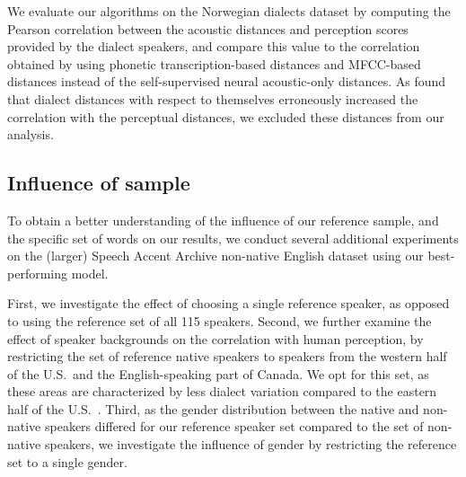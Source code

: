 \documentclass[11pt,a4paper]{article}
\begin{document}
We evaluate our algorithms on the Norwegian dialects dataset by computing the Pearson correlation between the acoustic distances and perception scores provided by the dialect speakers, and compare this value to the correlation obtained by using phonetic transcription-based distances and MFCC-based distances instead of the self-supervised neural acoustic-only distances. As \citet{gooskens2004perceptive} found that dialect distances with respect to themselves erroneously increased the correlation with the perceptual distances, we excluded these distances from our analysis.



\subsection{Influence of sample}
To obtain a better understanding of the influence of our reference sample, and the specific set of words on our results, we conduct several additional experiments on the (larger) Speech Accent Archive non-native English dataset using our best-performing model.

First, we investigate the effect of choosing a single reference speaker, as opposed to using the reference set of all 115 speakers. Second, we further examine the effect of speaker backgrounds on the correlation with human perception, by restricting the set of reference native speakers to speakers from the western half of the U.S.~and the English-speaking part of Canada. We opt for this set, as these areas are characterized by less dialect variation compared to the eastern half of the U.S.~\citep{boberg2010english}. Third, as the gender distribution between the native and non-native speakers differed for our reference speaker set compared to the set of non-native speakers, we investigate the influence of gender by restricting the reference set to a single gender.
\end{document}
